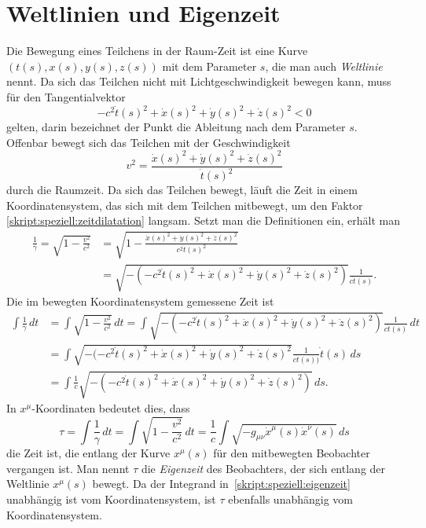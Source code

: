 \section{Weltlinien und Eigenzeit}
Die Bewegung eines Teilchens in der Raum-Zeit ist eine Kurve
$(t(s), x(s), y(s), z(s))$
mit dem Parameter $s$, die man auch {\em Weltlinie} nennt.
Da sich das Teilchen nicht mit Lichtgeschwindigkeit bewegen kann, muss
für den Tangentialvektor 
\[
-c^2\dot t(s)^2
+ \dot x(s)^2 + \dot y(s)^2 + \dot z(s)^2
<
0
\]
gelten, darin bezeichnet der Punkt die Ableitung nach dem 
Parameter $s$.
Offenbar bewegt sich das Teilchen mit der Geschwindigkeit
\[
v^2 = \frac{\dot x(s)^2 + \dot y(s)^2 + \dot z(s)^2}{\dot t(s)^2}
\]
durch die Raumzeit.
Da sich das Teilchen bewegt, läuft die Zeit in einem Koordinatensystem,
das sich mit dem Teilchen mitbewegt, um den Faktor
\eqref{skript:speziell:zeitdilatation}
langsam.
Setzt man die Definitionen ein, erhält man
\begin{align*}
\frac{1}{\gamma}
=
\sqrt{1-\frac{v^2}{c^2}}
&=
\sqrt{1- \frac{\dot x(s)^2 + \dot y(s)^2 + \dot z(s)^2}{c^2\dot t(s)^2}}
\\
&=
\sqrt{-(-c^2\dot t(s)^2+\dot x(s)^2 + \dot y(s)^2 + \dot z(s)^2)}\frac{1}{c\dot t(s)}.
\end{align*}
Die im bewegten Koordinatensystem gemessene Zeit ist
\begin{align*}
\int\frac{1}{\gamma}\,dt
&=
\int
\sqrt{1-\frac{v^2}{c^2}}\,dt
=
\int
\sqrt{-(-c^2\dot t(s)^2+\dot x(s)^2 + \dot y(s)^2 + \dot z(s)^2)}\frac{1}{c\dot t(s)}
\,dt
\\
&=
\int
\sqrt{-(-c^2\dot t(s)^2+\dot x(s)^2 + \dot y(s)^2 + \dot z(s)^2}\frac{1}{c\dot t(s))}
\dot t(s)\,ds
\\
&=
\int
\frac1c
\sqrt{-(-c^2\dot t(s)^2+\dot x(s)^2 + \dot y(s)^2 + \dot z(s)^2)}
\,ds.
\end{align*}
In $x^\mu$-Koordinaten bedeutet dies, dass
\begin{equation}
\tau
=
\int
\frac{1}{\gamma}\,dt
=
\int
\sqrt{1-\frac{v^2}{c^2}}\,dt
=
\frac1{c}
\int
\sqrt{-g_{\mu\nu}\dot x^\mu(s) \dot x^\nu(s)}\,ds
\label{skript:speziell:eigenzeit}
\end{equation}
die Zeit ist, die entlang der Kurve $x^\mu(s)$ für den
mitbewegten Beobachter vergangen ist.
Man nennt $\tau$ die {\em Eigenzeit} des
Beobachters, der sich entlang der Weltlinie $x^\mu(s)$ bewegt.
Da der Integrand in~\eqref{skript:speziell:eigenzeit} unabhängig ist
vom Koordinatensystem, ist $\tau$ ebenfalls unabhängig vom Koordinatensystem.

